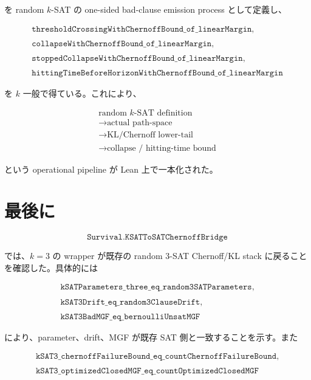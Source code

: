 \documentclass[12pt,a4paper]{article}
\begin{document}
を random \(k\)-SAT の one-sided bad-clause emission process として定義し、

\[
\begin{aligned}
\texttt{thresholdCrossingWithChernoffBound\_of\_linearMargin}, \\
\quad \\
\texttt{collapseWithChernoffBound\_of\_linearMargin}, \\
\quad \\
\texttt{stoppedCollapseWithChernoffBound\_of\_linearMargin}, \\
\quad \\
\texttt{hittingTimeBeforeHorizonWithChernoffBound\_of\_linearMargin}
\end{aligned}
\]

を \(k\) 一般で得ている。これにより、

\[
\begin{aligned}
\text{random }k\text{-SAT definition} \\
\to \text{actual path-space} \\
\to \text{KL/Chernoff lower-tail} \\
\to \text{collapse / hitting-time bound}
\end{aligned}
\]

という operational pipeline が Lean 上で一本化された。

\section{最後に}\label{ux6700ux5f8cux306b}

\[
\texttt{Survival.KSATToSATChernoffBridge}
\]

では、\(k=3\) の wrapper が既存の random 3-SAT Chernoff/KL stack に戻ることを確認した。具体的には

\[
\begin{aligned}
\texttt{kSATParameters\_three\_eq\_random3SATParameters}, \\
\qquad \\
\texttt{kSAT3Drift\_eq\_random3ClauseDrift}, \\
\qquad \\
\texttt{kSAT3BadMGF\_eq\_bernoulliUnsatMGF}
\end{aligned}
\]

により、parameter、drift、MGF が既存 SAT 側と一致することを示す。また

\[
\begin{aligned}
\texttt{kSAT3\_chernoffFailureBound\_eq\_countChernoffFailureBound}, \\
\qquad \\
\texttt{kSAT3\_optimizedClosedMGF\_eq\_countOptimizedClosedMGF}
\end{aligned}
\]
\end{document}
